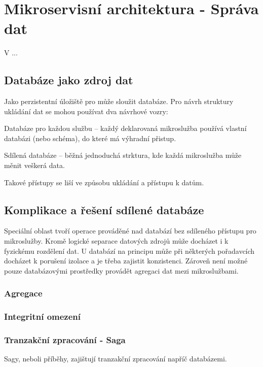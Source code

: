\chapter{Mikroservisní architektura - Správa dat}\label{ch:msa-data}


V ...


\section{Databáze jako zdroj dat}\label{sec:msa-db-as-data-source}

Jako perzistentní úložiště pro  může sloužit databáze.
Pro návrh struktury ukládání dat se mohou používat dva návrhové vozry:
\begin{dl}
   \item [Databáze pro každou službu] – každý deklarovaná mikroslužba používá vlastní databázi (nebo schéma), do které má výhradní přistup.
   \item [Sdílená databáze] – běžná jednoduchá strktura, kde každá mikroslužba může měnit veškerá data.
\end{dl}

Takové přístupy se liší ve způsobu ukládání a přístupu k datům.




\section{Komplikace a řešení sdílené databáze}\label{sec:msa-db-issues}

Speciální oblast tvoří operace prováděné nad databází bez sdíleného přístupu pro mikroslužby.
Kromě logické separace datových zdrojů může docházet i k fyzickému rozdělení dat.
U databází na principu  může při některých pořadavcích docházet k porušení izolace a je třeba zajistit konzistenci.
Zároveň není možné pouze databázovými prostředky provádět agregaci dat mezi mikroslužbami.

\subsection{Agregace}\label{subsec:msa-db-aggregate}

\subsection{Integritní omezení}\label{subsec:msa-db-integrity}
\subsection{Tranzakční zpracování - Saga}\label{subsec:msa-db-transaction}
Sagy, neboli příběhy, zajištují tranzakční zpracování napříč databázemi.
